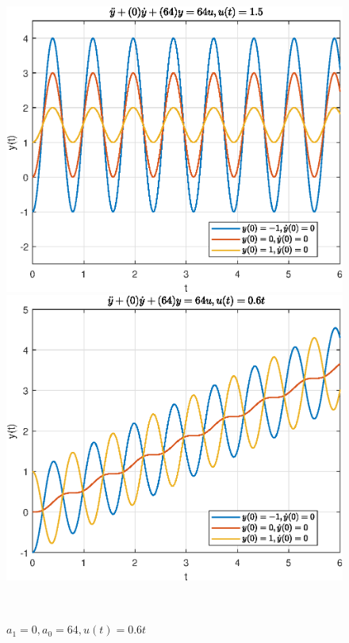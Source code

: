 \documentclass[a4paper]{article}
\begin{document}
\begin{figure}[H]
    \begin{minipage}{0.5\textwidth}
        \centering \includegraphics[width=\textwidth]{ex1/1.5_0_64.eps}
        \caption{$a_1 = 0, a_0 = 64, u(t) = 1.5$}
    \end{minipage}\hfill
    \begin{minipage}{0.5\textwidth}
        \centering \includegraphics[width=\textwidth]{ex1/0.6t_0_64.eps}
        \caption{$a_1 = 0, a_0 = 64, u(t) = 0.6t$}
    \end{minipage}\\[1em]
\end{figure}\noindent\
\end{document}
